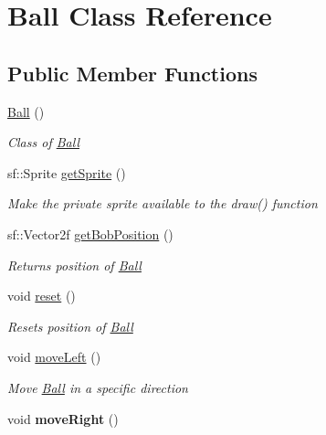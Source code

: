 \hypertarget{class_ball}{}\section{Ball Class Reference}
\label{class_ball}
\subsection*{Public Member Functions}
\begin{DoxyCompactItemize}
\item 
\mbox{\hyperlink{class_ball_a86a144d3dad6c953e422e32435923bbb}{Ball}} ()
\begin{DoxyCompactList}\small\item\em Class of \mbox{\hyperlink{class_ball}{Ball}} \end{DoxyCompactList}\item 
sf\+::\+Sprite \mbox{\hyperlink{class_ball_ab6c828e025d651a37b2644d72ed0cd7c}{get\+Sprite}} ()
\begin{DoxyCompactList}\small\item\em Make the private sprite available to the draw() function \end{DoxyCompactList}\item 
sf\+::\+Vector2f \mbox{\hyperlink{class_ball_a34fbfdd4fc49e594be834addef1b18c8}{get\+Bob\+Position}} ()
\begin{DoxyCompactList}\small\item\em Returns position of \mbox{\hyperlink{class_ball}{Ball}} \end{DoxyCompactList}\item 
void \mbox{\hyperlink{class_ball_ad51eef8304541159f12dee1f1674ec90}{reset}} ()
\begin{DoxyCompactList}\small\item\em Resets position of \mbox{\hyperlink{class_ball}{Ball}} \end{DoxyCompactList}\item 
void \mbox{\hyperlink{class_ball_ab50947921f203f92a3bfcf424247a47f}{move\+Left}} ()
\begin{DoxyCompactList}\small\item\em Move \mbox{\hyperlink{class_ball}{Ball}} in a specific direction \end{DoxyCompactList}\item 
\mbox{\label{class_ball_aeac32b787711d2ce4baa41592e384bab}} 
void {\bfseries move\+Right} ()
\item 

\end{DoxyCompactItemize}
